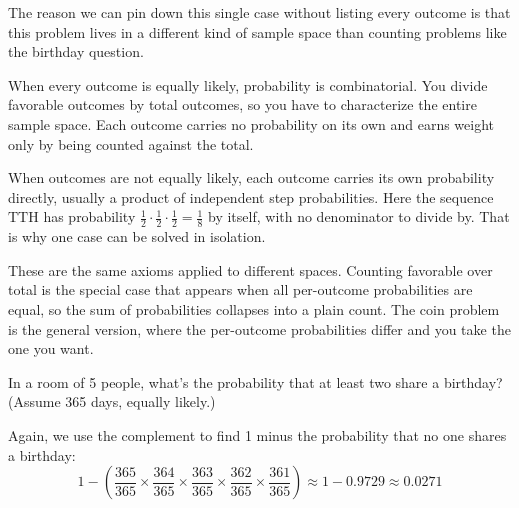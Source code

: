 \begin{remark}
The reason we can pin down this single case without listing every outcome is that this problem lives in a different kind of sample space than counting problems like the birthday question.

When every outcome is equally likely, probability is combinatorial. You divide favorable outcomes by total outcomes, so you have to characterize the entire sample space. Each outcome carries no probability on its own and earns weight only by being counted against the total.

When outcomes are not equally likely, each outcome carries its own probability directly, usually a product of independent step probabilities. Here the sequence $\text{TTH}$ has probability $\tfrac{1}{2}\cdot\tfrac{1}{2}\cdot\tfrac{1}{2} = \tfrac{1}{8}$ by itself, with no denominator to divide by. That is why one case can be solved in isolation.

These are the same axioms applied to different spaces. Counting favorable over total is the special case that appears when all per-outcome probabilities are equal, so the sum of probabilities collapses into a plain count. The coin problem is the general version, where the per-outcome probabilities differ and you take the one you want.
\end{remark}

\begin{problem}
In a room of 5 people, what's the probability that at least two share a birthday? (Assume 365 days, equally likely.)
\end{problem}

\begin{solution}
Again, we use the complement to find 1 minus the probability that no one shares a birthday:
\[
1 - \left ( \frac{365}{365} \times \frac{364}{365} \times \frac{363}{365} \times \frac{362}{365} \times \frac{361}{365}  \right ) \approx 1 - 0.9729 \approx 0.0271
\]
\end{solution}

